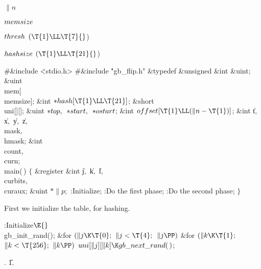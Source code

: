\Y\B\4\D$\|n$ \5
\par
\B\4\D$\\{memsize}$ \5
\par
\B\4\D$\\{thresh}$ \5
$(\T{1}\LL\T{7}{}$)\par
\B\4\D$\\{hashsize}$ \5
$(\T{1}\LL\T{21}{}$)\par
\Y\B\8\#\&{include} \.{<stdio.h>}\6
\8\#\&{include} \.{"gb\_flip.h"}\6
\&{typedef} \&{unsigned} \&{int} \&{uint};\6
\&{uint} \\{mem}[\\{memsize}];\6
\&{int} ${}{*}\\{hash}[\T{1}\LL\T{21}]{}$;\6
\&{short} \\{uni}[][];\6
\&{uint} ${}{*}\\{top},{}$ ${}{*}\\{start},{}$ ${}{*}\\{ostart}{}$;\6
\&{int} ${}\\{offset}[\T{1}\LL(\|n-\T{1})]{}$;\6
\&{int} \|t${},{}$ \|x${},{}$ \|y${},{}$ \|z${},{}$ \\{mask}${},{}$ \\{hmask};\6
\&{int} \\{count}${},{}$ \\{curn};\7
\\{main}(\,)\1\1\2\2\6
${}\{{}$\1\6
\&{register} \&{int} \|j${},{}$ \|k${},{}$ \|l${},{}$ \\{curbits}${},{}$ %
\\{curaux};\6
\&{uint} ${}{*}\|p;{}$\7
:Initialize\X;\6
:Do the first phase\X;\6
:Do the second phase\X;\6
\4${}\}{}$\2\par
\fi

First we initialize the  table, for hashing.

\Y\B\4:Initialize\X${}\E{}$\6
\\{gb\_init\_rand}();\6
\&{for} ${}(\|j\K\T{0};{}$ ${}\|j<\T{4};{}$ ${}\|j\PP){}$\1\6
\&{for} ${}(\|k\K\T{1};{}$ ${}\|k<\T{256};{}$ ${}\|k\PP){}$\1\5
${}\\{uni}[\|j][\|k]\K\\{gb\_next\_rand}(\,){}$;\2\2\par
{}.
\U1.\fi

